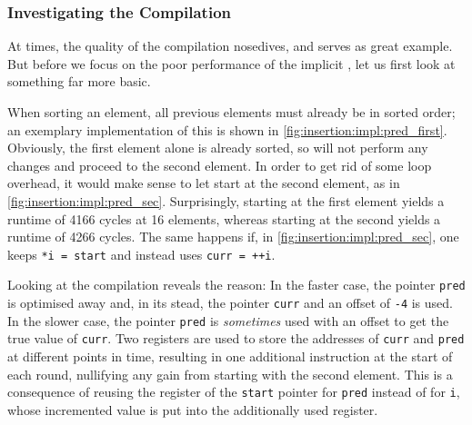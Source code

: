 \subsubsection*{Investigating the Compilation}
\label{subsubsec:tasklet:insertion:compiler}

At times, the quality of the compilation nosedives, and \IS{} serves as great example.
But before we focus on the poor performance of the implicit \IS{}, let us first look at something far more basic.

When sorting an element, all previous elements must already be in sorted order;
an exemplary implementation of this is shown in \cref{fig:insertion:impl:pred_first}.
Obviously, the first element alone is already sorted, so \IS{} will not perform any changes and proceed to the second element.
In order to get rid of some loop overhead, it would make sense to let \IS{} start at the second element, as in \cref{fig:insertion:impl:pred_sec}.
Surprisingly, starting at the first element yields a runtime of 4166 cycles at 16 elements, whereas starting at the second yields a runtime of 4266 cycles.
The same happens if, in \cref{fig:insertion:impl:pred_sec}, one keeps \lstinline|*i = start| and instead uses \lstinline|curr = ++i|.

Looking at the compilation reveals the reason:
In the faster case, the pointer \lstinline|pred| is optimised away and, in its stead, the pointer \lstinline|curr| and an offset of \lstinline|-4| is used.
In the slower case, the pointer \lstinline|pred| is \emph{sometimes} used with an offset to get the true value of \lstinline|curr|.
Two registers are used to store the addresses of \lstinline|curr| and \lstinline|pred| at different points in time, resulting in one additional instruction at the start of each round, nullifying any gain from starting with the second element.
This is a consequence of reusing the register of the \lstinline|start| pointer for \lstinline|pred| instead of for \lstinline|i|, whose incremented value is put into the additionally used register.

